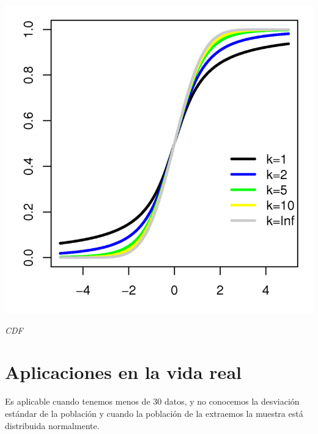 \begin{center}	
	\includegraphics[scale=2]{imgs/t-cdf.png}
	
	\textit{CDF}
\end{center}


\section{Aplicaciones en la vida real}

Es aplicable cuando tenemos menos de 30 datos, y no conocemos la desviación estándar de la población y cuando la población de la extraemos la muestra está distribuida normalmente.